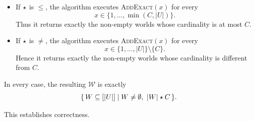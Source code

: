 \begin{appendixproof}
\begin{itemize}
\item If $\mathbin{\mathsf{\star}}$ is $\le$, the algorithm executes \textsc{AddExact}$(x)$ for every
\[
x\in\{1,\dots,\min(C,|U|)\}.
\]
Thus it returns exactly the non-empty worlds whose cardinality is at most $C$.

\item If $\mathbin{\mathsf{\star}}$ is $\neq$, the algorithm executes \textsc{AddExact}$(x)$ for every
\[
x\in\{1,\dots,|U|\}\setminus\{C\}.
\]
Hence it returns exactly the non-empty worlds whose cardinality is different from $C$.
\end{itemize}

In every case, the resulting  $\mathcal W$ is exactly
\[
  \{\,W\subseteq [|U|]\mid W\neq\emptyset,\ |W|\mathbin{\mathsf{\star}} C\,\}.
\]

This establishes correctness.
\end{appendixproof}


